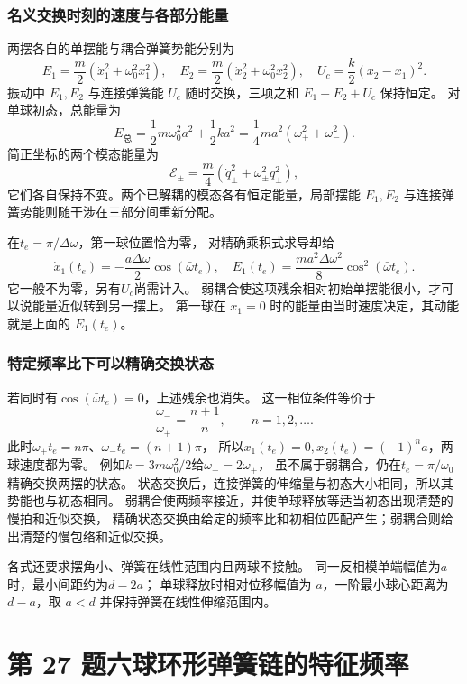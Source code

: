 \documentclass[UTF8,fontset=fandol,a4paper,11pt]{ctexart}
\begin{document}
\subsubsection*{名义交换时刻的速度与各部分能量}
两摆各自的单摆能与耦合弹簧势能分别为
\[
E_1=\frac m2(\dot x_1^2+\omega_0^2x_1^2),\quad
E_2=\frac m2(\dot x_2^2+\omega_0^2x_2^2),\quad
U_c=\frac k2(x_2-x_1)^2.
\]
振动中 $E_1,E_2$ 与连接弹簧能 $U_c$ 随时交换，三项之和 $E_1+E_2+U_c$ 保持恒定。
对单球初态，总能量为
\[
E_{\text{总}}=\frac12m\omega_0^2a^2+\frac12ka^2
=\frac14ma^2(\omega_+^2+\omega_-^2).
\]
简正坐标的两个模态能量为
\[
\mathcal E_\pm=\frac m4(\dot q_\pm^2+\omega_\pm^2q_\pm^2),
\]
它们各自保持不变。两个已解耦的模态各有恒定能量，局部摆能 $E_1,E_2$ 与连接弹簧势能则随干涉在三部分间重新分配。

在$t_e=\pi/\Delta\omega$，第一球位置恰为零，
对精确乘积式求导却给
\[
\dot x_1(t_e)=-\frac{a\Delta\omega}{2}\cos(\bar\omega t_e),
\quad E_1(t_e)=\frac{ma^2\Delta\omega^2}{8}\cos^2(\bar\omega t_e).
\]
它一般不为零，另有$U_c$尚需计入。
弱耦合使这项残余相对初始单摆能很小，才可以说能量近似转到另一摆上。
第一球在 $x_1=0$ 时的能量由当时速度决定，其动能就是上面的 $E_1(t_e)$。

\subsubsection*{特定频率比下可以精确交换状态}
若同时有$\cos(\bar\omega t_e)=0$，上述残余也消失。
这一相位条件等价于
\[
\frac{\omega_-}{\omega_+}=\frac{n+1}{n},\qquad n=1,2,\ldots.
\]
此时$\omega_+t_e=n\pi$、$\omega_-t_e=(n+1)\pi$，
所以$x_1(t_e)=0,x_2(t_e)=(-1)^n a$，两球速度都为零。
例如$k=3m\omega_0^2/2$给$\omega_-=2\omega_+$，
虽不属于弱耦合，仍在$t_e=\pi/\omega_0$精确交换两摆的状态。
状态交换后，连接弹簧的伸缩量与初态大小相同，所以其势能也与初态相同。
弱耦合使两频率接近，并使单球释放等适当初态出现清楚的慢拍和近似交换，
精确状态交换由给定的频率比和初相位匹配产生；弱耦合则给出清楚的慢包络和近似交换。

各式还要求摆角小、弹簧在线性范围内且两球不接触。
同一反相模单端幅值为$a$时，最小间距约为$d-2a$；
单球释放时相对位移幅值为 $a$，一阶最小球心距离为 $d-a$，取 $a<d$ 并保持弹簧在线性伸缩范围内。




\section*{第 27 题\quad 六球环形弹簧链的特征频率}
\end{document}
